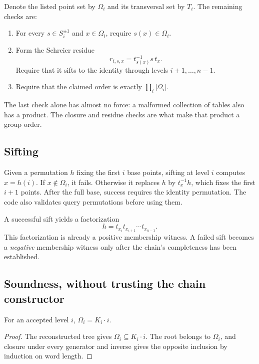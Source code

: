Denote the listed point set by $\Omega_i$ and its transversal set by $T_i$. The remaining checks are:
\begin{enumerate}
\item For every $s\in S_i^{\pm1}$ and $x\in\Omega_i$, require $s(x)\in\Omega_i$.
\item Form the Schreier residue
\begin{equation}
 r_{i,s,x}=t_{s(x)}^{-1}s\,t_x.\label{eq:schreier}
\end{equation}
Require that it sifts to the identity through levels $i+1,\ldots,n-1$.
\item Require that the claimed order is exactly $\prod_i|\Omega_i|$.
\end{enumerate}
The last check alone has almost no force: a malformed collection of tables also has a product. The closure and residue checks are what make that product a group order.

\subsection{Sifting}
Given a permutation $h$ fixing the first $i$ base points, sifting at level $i$ computes $x=h(i)$. If $x\notin\Omega_i$, it fails. Otherwise it replaces $h$ by $t_x^{-1}h$, which fixes the first $i+1$ points. After the full base, success requires the identity permutation. The code also validates query permutations before using them.

A successful sift yields a factorization
\begin{equation}
 h=t_{x_i}t_{x_{i+1}}\cdots t_{x_{n-1}}.
 \label{eq:sift-factorization}
\end{equation}
This factorization is already a positive membership witness. A failed sift becomes a \emph{negative} membership witness only after the chain's completeness has been established.

\subsection{Soundness, without trusting the chain constructor}
\begin{lemma}
For an accepted level $i$, $\Omega_i=K_i\cdot i$.
\end{lemma}
\begin{proof}
The reconstructed tree gives $\Omega_i\subseteq K_i\cdot i$. The root belongs to $\Omega_i$, and closure under every generator and inverse gives the opposite inclusion by induction on word length.
\end{proof}

